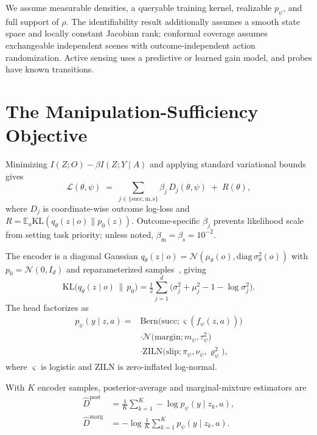 \documentclass[letterpaper, 10pt, conference]{ieeeconf}
\newcommand{\E}{\mathbb{E}}
\newcommand{\KL}{\mathrm{KL}}
\newcommand{\suff}{\mathrm{succ}}
\begin{document}
We assume measurable densities, a queryable training kernel, realizable
$p_\psi$, and full support of $\rho$. The identifiability result additionally
assumes a smooth state space and locally constant Jacobian rank; conformal
coverage assumes exchangeable independent scenes with outcome-independent
action randomization. Active sensing uses a predictive or learned gain model,
and probes have known transitions.

\section{The Manipulation-Sufficiency Objective}
\label{sec:objective}

Minimizing $I(Z;O)-\beta I(Z;Y\mid A)$ and applying standard variational
bounds~\cite{alemi2017} gives
\begin{equation}
\mathcal{L}(\theta,\psi)\;=\;\sum_{j\in\{\suff,\mathrm{m},\mathrm{s}\}}
\beta_j\, D_j(\theta,\psi)\;+\;R(\theta),
\label{eq:loss}
\end{equation}
where $D_j$ is coordinate-wise outcome log-loss and
$R=\E_o\KL(q_\theta(z\mid o)\|p_0(z))$. Outcome-specific $\beta_j$ prevents
likelihood scale from setting task priority; unless noted,
$\beta_{\mathrm m}=\beta_{\mathrm s}=10^{-2}$.

The encoder is a diagonal Gaussian
$q_\theta(z\mid o)=\mathcal{N}(\mu_\theta(o),\mathrm{diag}\,\sigma^2_\theta(o))$
with $p_0=\mathcal{N}(0,I_d)$ and reparameterized samples~\cite{kingma2014},
giving
\begin{equation}
\KL\bigl(q_\theta(z\mid o)\,\|\,p_0\bigr)=\tfrac12\sum_{j=1}^{d}
\bigl(\sigma_j^2+\mu_j^2-1-\log\sigma_j^2\bigr).
\label{eq:klclosed}
\end{equation}
The head factorizes as
\begin{equation}
\begin{split}
p_\psi(y\mid z,a)={}&\mathrm{Bern}\bigl(\suff;\varsigma(f_\psi(z,a))\bigr)\\
&\cdot\mathcal{N}\bigl(\mathrm{margin};m_\psi,\tau_\psi^2\bigr)\\
&\cdot\mathrm{ZILN}\bigl(\mathrm{slip};\pi_\psi,\nu_\psi,
\varrho_\psi^2\bigr),
\end{split}
\label{eq:headfactor}
\end{equation}
where $\varsigma$ is logistic and ZILN is zero-inflated log-normal.

With $K$ encoder samples, posterior-average and marginal-mixture estimators are
\begin{align}
\hat D^{\mathrm{post}}&=\frac1K\sum_{k=1}^{K}-\log p_\psi(y\mid z_k,a),
\label{eq:estimators}\\
\hat D^{\mathrm{marg}}&=-\log\frac1K\sum_{k=1}^{K} p_\psi(y\mid z_k,a).
\nonumber
\end{align}
\end{document}
